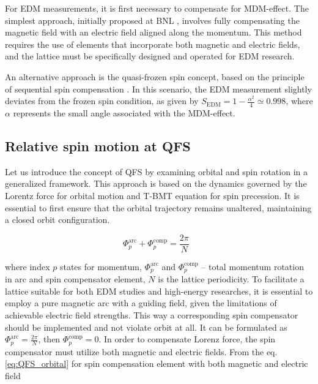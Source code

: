 \documentclass[submitting]{nst}
\begin{document}
\par For EDM measurements, it is first necessary to compensate for MDM-effect. The simplest approach, initially proposed at BNL \cite{AGS}, involves fully compensating the magnetic field with an electric field aligned along the momentum. This method requires the use of elements that incorporate both magnetic and electric fields, and the lattice must be specifically designed and operated for EDM research.
\par An alternative approach is the quasi-frozen spin concept, based on the principle of sequential spin compensation \cite{QFS}. In this scenario, the EDM measurement slightly deviates from the frozen spin condition, as given by $S_{\text{EDM}}=1-\frac{\alpha^2}{4} \simeq 0.998$, where $\alpha$ represents the small angle associated with the MDM-effect.

\subsection{Relative spin motion at QFS}    

\par Let us introduce the concept of QFS by examining orbital and spin rotation in a generalized framework. This approach is based on the dynamics governed by the Lorentz force for orbital motion and T-BMT equation for spin precession. It is essential to first ensure that the orbital trajectory remains unaltered, maintaining a closed orbit configuration.

\begin{equation}
	\Phi_p^{\textrm{arc}}+\Phi_{p}^{\textrm{comp}}=\frac{2\pi}{N}\ \ \
	\label{eq:QFS_orbital}
\end{equation}

\noindent where index $p$ states for momentum, $\Phi_p^{\textrm{arc}}$ and $\Phi_{p}^{\textrm{comp}}$ -- total momentum rotation in arc and spin compensator element, $N$ is the lattice periodicity. To facilitate a lattice suitable for both EDM studies and high-energy researches, it is essential to employ a pure magnetic arc with a guiding field, given the limitations of achievable electric field strengths. This way a corresponding spin compensator should be implemented and not violate orbit at all. It can be formulated as $\Phi_p^{\textrm{arc}} = \frac{2\pi}{N}$, then $\Phi_{p}^{\textrm{comp}} = 0$. In order to compensate Lorenz force, the spin compensator must utilize both magnetic and electric fields. From the eq. \ref{eq:QFS_orbital} for spin compensation element with both magnetic and electric field
\end{document}

